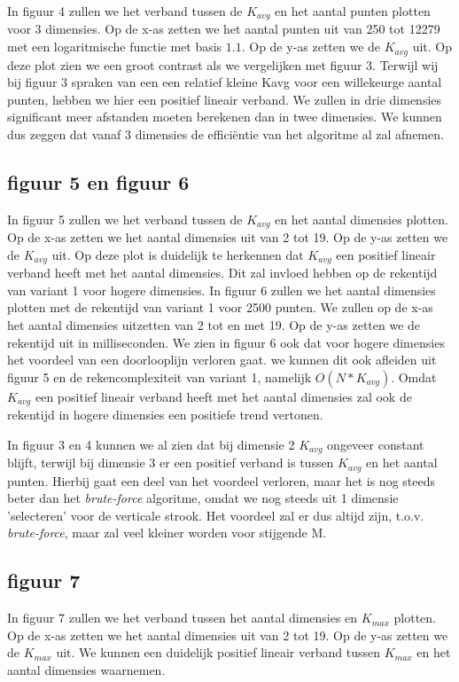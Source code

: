 \documentclass[12pt]{article}
\begin{document}
In figuur 4 zullen we het verband tussen de $K_{avg}$ en het aantal punten plotten voor 3 dimensies.
Op de x-as zetten we het aantal punten uit van 250 tot 12279 met een logaritmische functie met basis $1.1$.
Op de y-as zetten we de $K_{avg}$ uit.
Op deze plot zien we een groot contrast als we vergelijken met figuur 3.
Terwijl wij bij figuur 3 spraken van een een relatief kleine Kavg voor een willekeurge aantal punten, hebben we hier een positief lineair verband.
We zullen in drie dimensies significant meer afstanden moeten berekenen dan in twee dimensies.
We kunnen dus zeggen dat vanaf 3 dimensies de efficiëntie van het algoritme al zal afnemen.

\subsection{figuur 5 en figuur 6}
In figuur 5 zullen we het verband tussen de $K_{avg}$ en het aantal dimensies plotten.
Op de x-as zetten we het aantal dimensies uit van 2 tot 19.
Op de y-as zetten we de $K_{avg}$ uit.
Op deze plot is duidelijk te herkennen dat $K_{avg}$ een positief lineair verband heeft met het aantal dimensies.
Dit zal invloed hebben op de rekentijd van variant 1 voor hogere dimensies.
In figuur 6 zullen we het aantal dimensies plotten met de rekentijd van variant 1 voor 2500 punten.
We zullen op de x-as het aantal dimensies uitzetten van 2 tot en met 19.
Op de y-as zetten we de rekentijd uit in milliseconden.
We zien in figuur 6 ook dat voor hogere dimensies het voordeel van een doorlooplijn verloren gaat.
we kunnen dit ook afleiden uit figuur 5 en de rekencomplexiteit van variant 1, namelijk $O(N*K_{avg})$.
Omdat $K_{avg}$ een positief lineair verband heeft met het aantal dimensies zal ook de rekentijd in hogere dimensies een positiefe trend vertonen.

\newpage
In figuur 3 en 4 kunnen we al zien dat bij dimensie 2 $K_{avg}$ ongeveer constant blijft, terwijl bij dimensie 3 er een positief verband is tussen $K_{avg}$ en het aantal punten.
Hierbij gaat een deel van het voordeel verloren, maar het is nog steeds beter dan het \textit{brute-force} algoritme, omdat we nog steeds uit 1 dimensie 'selecteren' voor de verticale strook.
Het voordeel zal er dus altijd zijn, t.o.v. \textit{brute-force}, maar zal veel kleiner worden voor stijgende M.

\subsection{figuur 7}
In figuur 7 zullen we het verband tussen het aantal dimensies en $K_{max}$ plotten.
Op de x-as zetten we het aantal dimensies uit van 2 tot 19.
Op de y-as zetten we de $K_{max}$ uit.
We kunnen een duidelijk positief lineair verband tussen $K_{max}$ en het aantal dimensies waarnemen.
\end{document}
